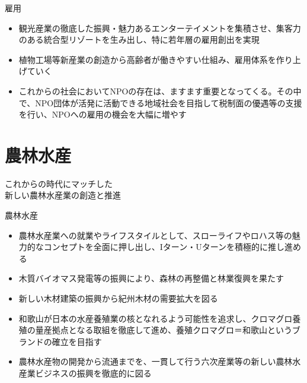 \documentclass[dvipdfmx]{beamer}
\begin{document}
    \begin{frame}{雇用}{}
        \begin{small}
            \begin{itemize}
                \setlength{\parsep}{.5mm}
                \setlength{\itemsep}{2mm}
                \item 観光産業の徹底した振興・魅力あるエンターテイメントを集積させ、集客力のある統合型リゾートを生み出し、特に若年層の雇用創出を実現
                \item 植物工場等新産業の創造から高齢者が働きやすい仕組み、雇用体系を作り上げていく
                \item これからの社会においてNPOの存在は、ますます重要となってくる。その中で、NPO団体が活発に活動できる地域社会を目指して税制面の優遇等の支援を行い、NPOへの雇用の機会を大幅に増やす
            \end{itemize}
        \end{small}
    \end{frame}
    
\section{農林水産}
    \begin{frame}{}{}
        \sectionpage
        \begin{center}
            \begin{large}
                \alert{これからの時代にマッチした}\\\alert{新しい農林水産業の創造と推進}
            \end{large}
        \end{center}
    \end{frame}

    \begin{frame}{農林水産}{}
        \begin{small}
            \begin{itemize}
                \setlength{\parsep}{.5mm}
                \setlength{\itemsep}{2mm}
                \item 農林水産業への就業やライフスタイルとして、スローライフやロハス等の魅力的なコンセプトを全面に押し出し、Iターン・Uターンを積極的に推し進める
                \item 木質バイオマス発電等の振興により、森林の再整備と林業復興を果たす
                \item 新しい木材建築の振興から紀州木材の需要拡大を図る
                \item 和歌山が日本の水産養殖業の核となれるよう可能性を追求し、クロマグロ養殖の量産拠点となる取組を徹底して進め、養殖クロマグロ＝和歌山というブランドの確立を目指す
                \item 農林水産物の開発から流通までを、一貫して行う六次産業等の新しい農林水産業ビジネスの振興を徹底的に図る
            \end{itemize}
        \end{small}
    \end{frame}
\end{document}
